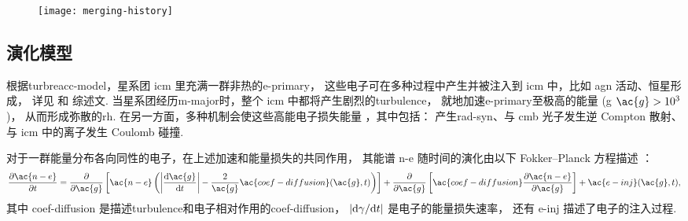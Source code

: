 \begin{figure}[htp]
  \centering
  \texttt{[image: merging-history]}
  \label{fig:merging-history}
\end{figure}

\subsection{演化模型}
\label{sec:halo-evo}

根据\ac{turbreacc-model}，星系团 \ac{icm} 里充满一群非热的\ac{e-primary}，
这些电子可在多种过程中产生并被注入到 \ac{icm} 中，比如 \ac{agn} 活动、恒星形成，
详见  和  综述文.
当星系团经历\ac{m-major}时，整个 \ac{icm} 中都将产生剧烈的\ac{turbulence}，
就地加速\ac{e-primary}至极高的能量 (\acl{g} $\ac{g} > \num{e3}$)，
从而形成弥散的\ac{rh}.
在另一方面，多种机制会使这些高能电子损失能量 \cite{sarazin1999}，其中包括：
产生\ac{rad-syn}、与 \ac{cmb} 光子发生逆 Compton 散射、
与 \ac{icm} 中的离子发生 Coulomb 碰撞.

对于一群能量分布各向同性的电子，在上述加速和能量损失的共同作用，
其能谱 \ac{n-e} 随时间的演化由以下 Fokker--Planck 方程描述
\cite{eilek1991,schlickeiser2002}：
\begin{equation}
  \label{eq:fokkerplanck}
  \pdiff{\ac{n-e}}{t} =
    \pdiff{}{\ac{g}} \left[ \ac{n-e} \left(
      \left| \diff{\ac{g}}{t} \right| -
      \frac{2}{\ac{g}} \ac{coef-diffusion}(\ac{g}, t) \right) \right]
    + \pdiff{}{\ac{g}} \left[
      \ac{coef-diffusion} \pdiff{\ac{n-e}}{\ac{g}} \right]
    + \ac{e-inj}(\ac{g}, t) ,
\end{equation}
其中
\ac{coef-diffusion} 是描述\ac{turbulence}和电子相对作用的\acl{coef-diffusion}，
$|\mathrm{d}\gamma / \mathrm{d}t|$ 是电子的能量损失速率，
还有 \ac{e-inj} 描述了电子的注入过程.

